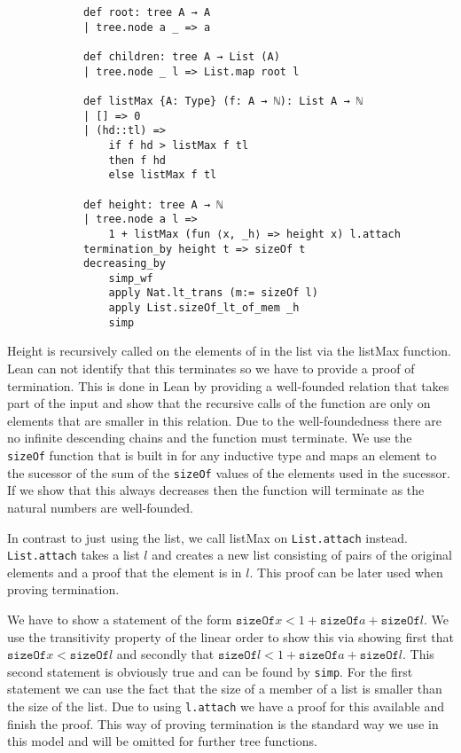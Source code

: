 \documentclass{article}
\begin{document}
        \begin{lstlisting}
            def root: tree A → A
            | tree.node a _ => a

            def children: tree A → List (A)
            | tree.node _ l => List.map root l

            def listMax {A: Type} (f: A → ℕ): List A → ℕ
            | [] => 0
            | (hd::tl) => 
                if f hd > listMax f tl 
                then f hd 
                else listMax f tl

            def height: tree A → ℕ
            | tree.node a l => 
                1 + listMax (fun ⟨x, _h⟩ => height x) l.attach
            termination_by height t => sizeOf t
            decreasing_by
                simp_wf
                apply Nat.lt_trans (m:= sizeOf l)
                apply List.sizeOf_lt_of_mem _h
                simp
        \end{lstlisting}
        
        Height is recursively called on the elements of in the list via the listMax function. Lean can not identify that this terminates so we have to provide a proof of termination. This is done in Lean by providing a well-founded relation that takes part of the input and show that the recursive calls of the function are only on elements that are smaller in this relation. Due to the well-foundedness there are no infinite descending chains and the function must terminate.  We use the \texttt{sizeOf} function that is built in for any inductive type and maps an element to the sucessor of the sum of the \texttt{sizeOf} values of the elements used in the sucessor. If we show that this always decreases then the function will terminate as the natural numbers are well-founded.

        In contrast to just using the list, we call listMax on \texttt{List.attach} instead. \texttt{List.attach} takes a list $l$ and creates a new list consisting of pairs of the original elements and a proof that the element is in $l$. This proof can be later used when proving termination.

        We have to show a statement of the form $\mathtt{sizeOf} x < 1 + \mathtt{sizeOf} a + \mathtt{sizeOf} l$. We use the transitivity property of the linear order to show this via showing first that $\mathtt{sizeOf} x < \mathtt{sizeOf} l$ and secondly that $\mathtt{sizeOf} l < 1 + \mathtt{sizeOf} a + \mathtt{sizeOf} l$. This second statement is obviously true and can be found by \texttt{simp}. For the first statement we can use the fact that the size of a member of a list is smaller than the size of the list. Due to using \texttt{l.attach} we have a proof for this available and finish the proof.
        This way of proving termination is the standard way we use in this model and will be omitted for further tree functions.
\end{document}
